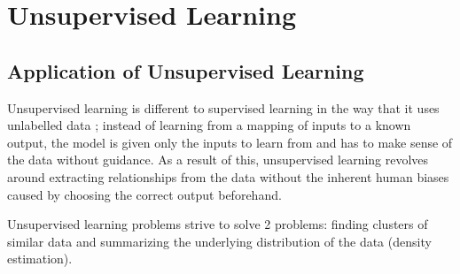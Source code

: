 \documentclass[10pt,a4paper]{report}
\begin{document}
	\chapter{Unsupervised Learning}

			\section{Application of Unsupervised Learning}
			Unsupervised learning is different to supervised learning in the way that it uses unlabelled data \autocite[p. 105]{DeepLearning}; instead
			of learning from a mapping of inputs to a known output, the model is given only the inputs to learn from and has to make sense of the data without guidance.
			As a result of this, unsupervised learning revolves around extracting relationships from the data without the inherent human biases caused by choosing the correct output beforehand. \par
			Unsupervised learning problems strive to solve 2 problems: finding clusters of similar data and summarizing the underlying distribution of the data
			(density estimation).
\end{document}
